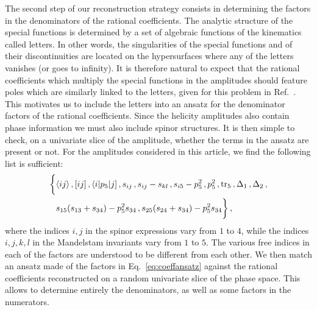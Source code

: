 \documentclass[main.tex]{subfiles}
\begin{document}
The second step of our reconstruction strategy consists in determining the factors in the denominators of the rational coefficients. The analytic structure of the special functions is determined by a set of algebraic functions of the kinematics called letters. In other words, the singularities of the special functions and of their discontinuities are located on the hypersurfaces where any of the letters vanishes (or goes to infinity). It is therefore natural to expect that the rational coefficients which multiply the special functions in the amplitudes should feature poles which are similarly linked to the letters, given for this problem in Ref.~\cite{Abreu:2020jxa}. 
This motivates us to include the letters into an ansatz for the denominator factors of the rational coefficients. Since the helicity amplitudes also contain phase information we must also include spinor structures. It is then simple to check, on a univariate slice of the amplitude, whether the terms in the ansatz are present or not. For the amplitudes considered in this article, we find the following list is sufficient:
\begin{equation}
\begin{aligned}
\biggl\{  & \langle ij\rangle \,,  [ij]  \,, \langle i|p_5|j]  \,, s_{ij} \,, s_{ij} - s_{kl} \,, 
  s_{i5} - p_5^2 \,, p_5^2 \,, \operatorname{\rm tr}_5 \, , \Delta_1 \,, \Delta_2 \, , \\
&  s_{15} (s_{13}+s_{34}) - p_5^2  s_{34}  \,,
 s_{25} (s_{24}+s_{34}) - p_5^2  s_{34} \biggr\} \,,
\end{aligned}
\label{eq:coeffansatz}
\end{equation}
where the indices $i,j$ in the spinor expressions vary from $1$ to $4$, while the indices $i,j,k,l$ in the Mandelstam invariants vary from $1$ to $5$. The various free indices in each of the factors are understood to be different from each other. We then match an ansatz made of the factors in Eq.~\ref{eq:coeffansatz} against the rational coefficients reconstructed on a random univariate slice of the phase space. This allows to determine entirely the denominators, as well as some factors in the numerators.
\end{document}
